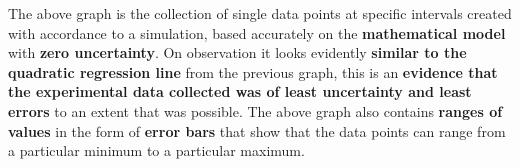{The above graph is the collection of single data points at specific intervals created with accordance to a simulation, based accurately on the \textbf{mathematical model} with \textbf{zero uncertainty}. On observation it looks evidently \textbf{similar to the quadratic regression line} from the previous graph, this is an \textbf{evidence that the experimental data collected was of least uncertainty and least errors} to an extent that was possible. The above graph also contains \textbf{ranges of values }in the form of \textbf{error bars} that show that the data points can range from a particular minimum to a particular maximum.}


